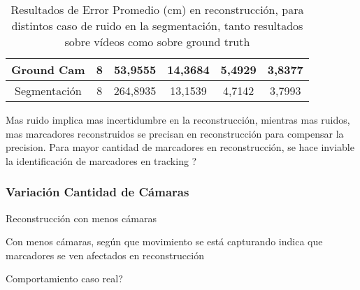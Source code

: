 \begin{table}[h]
\begin{tabular}{|c|c|c|c|c|c|}
Ground Cam    & 8                                                             & 53,9555                                                         & 14,3684                                                         & 5,4929                                                          & 3,8377                                                          \\ \hline
Segmentación  & 8                                                             & 264,8935                                                        & 13,1539                                                         & 4,7142                                                          & 3,7993                                                          \\ \hline
\end{tabular}
\caption{Resultados de Error Promedio (cm) en reconstrucción, para distintos caso de ruido en la segmentación, tanto resultados sobre vídeos como sobre ground truth}
\end{table}

Mas ruido implica mas incertidumbre en la reconstrucción, mientras mas ruidos, mas marcadores reconstruidos se precisan en reconstrucción para compensar la precision. Para mayor cantidad de marcadores en reconstrucción, se hace inviable la identificación de marcadores en tracking ?

\subsubsection{Variación Cantidad de Cámaras}

Reconstrucción con menos cámaras

Con menos cámaras, según que movimiento se está capturando indica que marcadores se ven afectados en reconstrucción


Comportamiento caso real?


